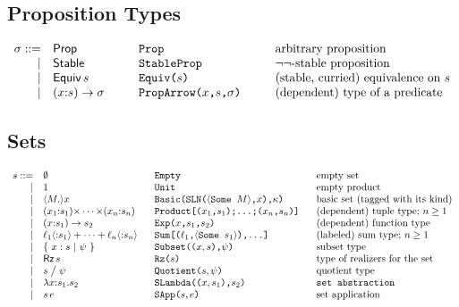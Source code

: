 \documentclass[12pt]{article}
\newcommand{\M}{M}
\newcommand{\e}{e}
\newcommand{\s}{s}
\newcommand{\n}{x} %
\newcommand{\p}{\psi} %
\newcommand{\pt}{\sigma} %
\newcommand{\x}{\n} %
\renewcommand{\k}{\kappa} %
\renewcommand{\l}{{\ell}}
\newcommand{\ptProp}{\mathsf{Prop}}
\newcommand{\ptStable}{\mathsf{Stable}}
\newcommand{\ptEquiv}[1]{\mathop{\mathsf{Equiv}} #1}
\newcommand{\ptArrow}[3]{(#1{:}#2)\to #3}
\newcommand{\sArrow}[3]{(#1{:}#2)\to #3}
\newcommand{\sApp}[2]{#1\,#2}
\begin{document}
\subsection{Proposition Types}
\[
\begin{array}{rl@{\hspace{1cm}}l@{\hspace{1cm}}l}
\pt ::= & \ptProp & \texttt{Prop} & \mbox{arbitrary proposition}\\
   |& \ptStable & \texttt{StableProp} & \mbox{$\lnot\lnot$-stable proposition}\\
  |& \ptEquiv{\s} & \texttt{Equiv($\s$)} &\mbox{(stable, curried) equivalence on $\s$}\\
 |& \ptArrow{\x}{\s}{\pt} & \texttt{PropArrow($\x$,$\s$,$\pt$)} & \mbox{(dependent) type of a predicate}\\
\end{array}
\]

\subsection{Sets}
\[
\begin{array}{rl@{\hspace{0.6cm}}l@{\hspace{0.6cm}}l}
\s ::= & \emptyset & \texttt{Empty} & \mbox{empty set}\\
|& 1 & \texttt{Unit} & \mbox{empty product}\\
|&\langle\M.\rangle\n & \texttt{Basic(SLN($\langle$Some $\M\rangle$,$\n$),$\k$)} & \mbox{basic set (tagged with its kind)}\\
|& (\x_1{:}\s_1){\times}\cdots{\times}(\x_n{:}\s_n) & 
    \texttt{Product[($\x_1$,$\s_1$);\ldots;($\x_n$,$\s_n$)]}&\mbox{(dependent) tuple type; $n\ge 1$}\\
|& \sArrow{\x}{\s_1}{\s_2} & \texttt{Exp($\x$,$\s_1$,$\s_2$)} & \mbox{(dependent) function type}\\
|& \l_1\langle{:}\s_1\rangle+\cdots+\l_n\langle{:}\s_n\rangle & \texttt{Sum[($\l_1$,$\langle$Some $\s_1$$\rangle$),\ldots] }& \mbox{(labeled) sum type; $n\ge 1$}\\
|&\{\ \x:\s\ |\ \p\ \} & \texttt{Subset(($\x,\s$),$\p$)} & \mbox{subset type}\\
|&\mathop{\mathsf{Rz}}\s & \texttt{Rz($\s$)} & \mbox{type of realizers for the set}\\
|&\s\bigm/\p & \texttt{Quotient($\s,\p$)} & \mbox{quotient type}\\
|&\lambda\x{:}\s_1.\s_2&\texttt{SLambda(($\x,\s_1$),$\s_2$)}&\texttt{set abstraction}\\
|&\sApp{\s}{\e}&\texttt{SApp($\s,\e$)}&\mbox{set application}\\
\end{array}
\]
\end{document}
